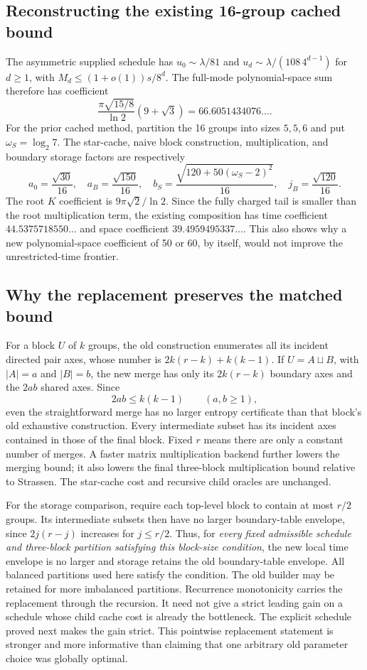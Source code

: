 \documentclass[11pt,letterpaper]{article}
\theoremstyle{definition}\newtheorem{definition}[theorem]{Definition}
\theoremstyle{remark}\newtheorem{remark}[theorem]{Remark}
\begin{document}
\subsection{Reconstructing the existing 16-group cached bound}
The asymmetric supplied schedule has
$u_0\sim\lambda/81$ and $u_d\sim\lambda/(108\,4^{d-1})$ for $d\ge1$, with
$M_d\le(1+o(1))s/8^d$. The full-mode polynomial-space sum therefore has coefficient
\[
 \frac{\pi\sqrt{15/8}}{\ln2}(9+\sqrt3)
 =66.6051434076\ldots.
\]
For the prior cached method, partition the 16 groups into sizes $5,5,6$ and put
$\omega_S=\log_2 7$. The star-cache, naive block construction, multiplication, and
boundary storage factors are respectively
\[
 a_0=\frac{\sqrt{30}}{16},\quad a_B=\frac{\sqrt{150}}{16},\quad
 b_S=\frac{\sqrt{120+50(\omega_S-2)^2}}{16},\quad
 j_B=\frac{\sqrt{120}}{16}.
\]
The root $K$ coefficient is $9\pi\sqrt2/\ln2$. Since the fully charged tail is smaller
than the root multiplication term, the existing composition has time coefficient
$44.5375718550\ldots$ and space coefficient $39.4959495337\ldots$.
This also shows why a new polynomial-space coefficient of 50 or 60, by itself, would
not improve the unrestricted-time frontier.

\subsection{Why the replacement preserves the matched bound}
For a block $U$ of $k$ groups, the old construction enumerates all its incident directed
pair axes, whose number is $2k(r-k)+k(k-1)$. If $U=A\sqcup B$, with $|A|=a$ and
$|B|=b$, the new merge has only its $2k(r-k)$ boundary axes and the $2ab$ shared axes.
Since
\[
 2ab\le k(k-1)\qquad(a,b\ge1),
\]
even the straightforward merge has no larger entropy certificate than that block's
old exhaustive construction. Every intermediate subset has its incident axes contained
in those of the final block. Fixed $r$ means there are only a constant number of merges.
A faster matrix multiplication backend further lowers the merging bound; it also
lowers the final three-block multiplication bound relative to Strassen. The star-cache
cost and recursive child oracles are unchanged.

For the storage comparison, require each top-level block to contain at most $r/2$
groups. Its intermediate subsets then have no larger boundary-table envelope, since
$2j(r-j)$ increases for $j\le r/2$. Thus, for \emph{every fixed admissible schedule
and three-block partition satisfying this block-size condition}, the new local time
envelope is no larger and storage retains the old boundary-table envelope. All balanced
partitions used here satisfy the condition. The old builder may be retained for more
imbalanced partitions. Recurrence monotonicity carries the replacement through the recursion. It need not give a strict leading gain on a schedule whose child
cache cost is already the bottleneck. The explicit schedule proved next makes the gain
strict. This pointwise replacement statement is stronger and more informative than
claiming that one arbitrary old parameter choice was globally optimal.
\end{document}

